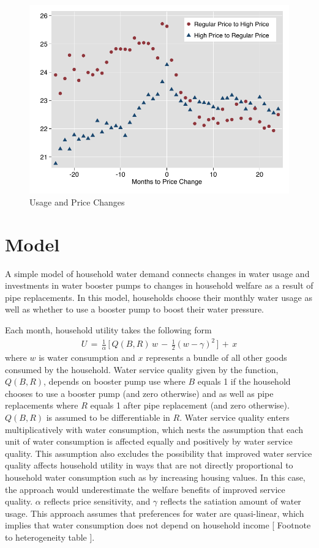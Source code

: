 \documentclass[12pt,table]{article}
\begin{document}
\begin{figure}
\begin{center}
\caption{Usage and Price Changes}\label{figure:usagepricechanges}
\includegraphics[scale=1]{tables/r_to_s_graph.pdf}
\end{center}
\end{figure}

\section{Model}

A simple model of household water demand connects changes in water usage and investments in water booster pumps to changes in household welfare as a result of pipe replacements.  In this model, households choose their monthly water usage as well as whether to use a booster pump to boost their water pressure.  

Each month, household utility takes the following form
\begin{align}
\label{eq:utility}
U\,=\,\frac{1}{\alpha} \, \Big[ \,  Q(B,R) \,  w  \, -\, \frac{1}{2}(w - \gamma)^2 \, \Big] \, + \, x 
\end{align}
where $w$ is water consumption and $x$ represents a bundle of all other goods consumed by the household.  Water service quality given by the function, $Q(B,R)$, depends on booster pump use where $B$ equals 1 if the household chooses to use a booster pump (and zero otherwise) and as well as pipe replacements where $R$ equals 1 after pipe replacement (and zero otherwise).  $Q(B,R)$ is assumed to be differentiable in $R$.  Water service quality enters multiplicatively with water consumption, which nests the assumption that each unit of water consumption is affected equally and positively by water service quality.  This assumption also excludes the possibility that improved water service quality affects household utility in ways that are not directly proportional to household water consumption such as by increasing housing values.  In this case, the approach would underestimate the welfare benefits of improved service quality.  $\alpha$ reflects price sensitivity, and $\gamma$ reflects the satiation amount of water usage.  This approach assumes that preferences for water are quasi-linear, which implies that water consumption does not depend on household income [ Footnote to heterogeneity table ].  
\end{document}
